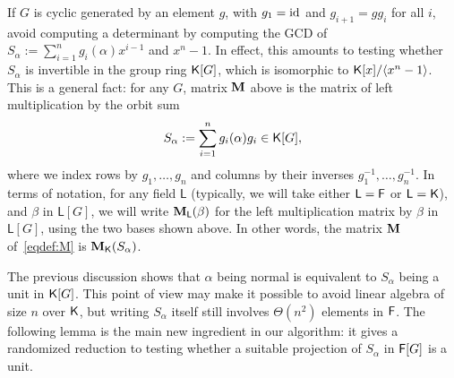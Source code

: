 If $G$ is cyclic generated by an element $g$, with $g_1 = {\rm id}$
and $g_{i+1} = g g_i$ for all $i$, \cite{GatGie90} avoid computing a
determinant by computing the GCD of $S_\alpha := \sum_{i = 1}^{n}
g_i(\alpha)x^{i-1}$ and $x^n-1$. In effect, this amounts to testing
whether $S_\alpha$ is invertible in the group ring ${\mathsf{K}}[G]$, which is
isomorphic to ${\mathsf{K}}[x]/\langle x^n-1\rangle$. This is a general fact:
for any $G$, matrix $\mat M$ above is the matrix of left
multiplication by the orbit sum
$$S_\alpha:= \sum_{i=1}^n g_i(\alpha)g_i \in {\mathsf{K}}[G],$$ where we index
rows by $g_1,\dots,g_n$ and columns by their inverses
$g_1^{-1},\dots,g_n^{-1}$. In terms of notation, for any field
$\mathsf L$ (typically, we will take either $\mathsf L = {\mathsf{F}}$ or
$\mathsf L = {\mathsf{K}}$), and $\beta$ in $\mathsf L[G]$, we will write $\mat
M_{\mathsf L}(\beta)$ for the left multiplication matrix by $\beta$ in
$\mathsf L[G]$, using the two bases shown above.  In other words, the
matrix $\mat M$ of~\eqref{eqdef:M} is $\mat M_\K(S_\alpha)$.

The previous discussion shows that $\alpha$ being normal is equivalent
to $S_\alpha$ being a unit in ${\mathsf{K}}[G]$. This point of view may make it
possible to avoid linear algebra of size $n$ over ${\mathsf{K}}$, but writing
$S_\alpha$ itself still involves $\Theta(n^2)$ elements in ${\mathsf{F}}$. The
following lemma is the main new ingredient in our algorithm: it gives
a randomized reduction to testing whether a suitable projection of
$S_\alpha$ in ${\mathsf{F}}[G]$ is a unit.


